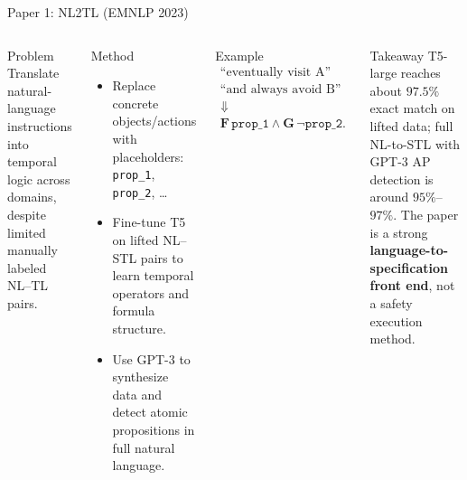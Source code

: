 \documentclass[aspectratio=169]{beamer}
\newcommand{\stlG}{\mathbf{G}}
\newcommand{\stlF}{\mathbf{F}}
\begin{document}
\begin{frame}{Paper 1: NL2TL (EMNLP 2023)}
\begin{columns}[T]
\begin{block}{Problem}
\footnotesize
Translate natural-language instructions into temporal logic across domains, despite limited manually labeled NL--TL pairs.
\end{block}

\begin{block}{Method}
\footnotesize
\begin{itemize}
  \item Replace concrete objects/actions with placeholders: \texttt{prop\_1}, \texttt{prop\_2}, \ldots
  \item Fine-tune T5 on lifted NL--STL pairs to learn temporal operators and formula structure.
  \item Use GPT-3 to synthesize data and detect atomic propositions in full natural language.
\end{itemize}
\end{block}

\begin{block}{Example}
\scriptsize
\[
\begin{array}{c}
\text{``eventually visit A''}\\[-0.15em]
\text{``and always avoid B''}\\[0.15em]
\Downarrow\\[0.15em]
\stlF\,\texttt{prop\_1}\wedge \stlG\,\neg\texttt{prop\_2}.
\end{array}
\]
\end{block}

\begin{block}{Takeaway}
\footnotesize
T5-large reaches about \(97.5\%\) exact match on lifted data; full NL-to-STL with GPT-3 AP detection is around \(95\%\)--\(97\%\). The paper is a strong \textbf{language-to-specification front end}, not a safety execution method.
\end{block}
\end{columns}
\end{frame}
\end{document}
